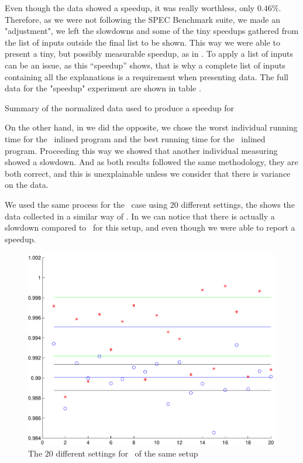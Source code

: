 Even though the data showed a speedup, it was really worthless, only $0.46 \%$. Therefore, as we were not following the SPEC Benchmark suite, we made an "adjustment", we left the slowdowns and some of the tiny speedups gathered from the list of inputs outside the final list to be shown. This way we were able to present a tiny, but possibly measurable speedup, as in . To apply a list of inputs can be an issue, as this ``speedup'' shows, that is why a complete list of inputs containing all the explanations is a requirement when presenting data. The full data for the "speedup" experiment are shown in table .

\begin{table}
  \centering
  \begin{tiny}
  
  \end{tiny}
  \caption{Summary of the normalized data used to produce a speedup for \bzip}
  \label{tab:fullexp}
\end{table}

On the other hand, in  we did the opposite, we chose the worst individual running time for the \FDI\ inlined program and the best running time for the \llvm\ inlined program. Proceeding this way we showed that another individual measuring showed a slowdown. And as both results followed the same methodology, they are both correct, and this is unexplainable unless we consider that there is variance on the data.

We used the same process for the \gzip\ case using $20$ different settings, the  shows the data collected in a similar way of . In  we can notice that there is actually a slowdown compared to \llvm\ for this setup, and even though we were able to report a speedup.

\begin{figure}
  \centering
  \includegraphics[width=1.00\linewidth]{Figures/gzipfdll}
  \caption{The $20$ different settings for \gzip\ of the same setup}
  \label{fig:gzipfdll}
\end{figure}

